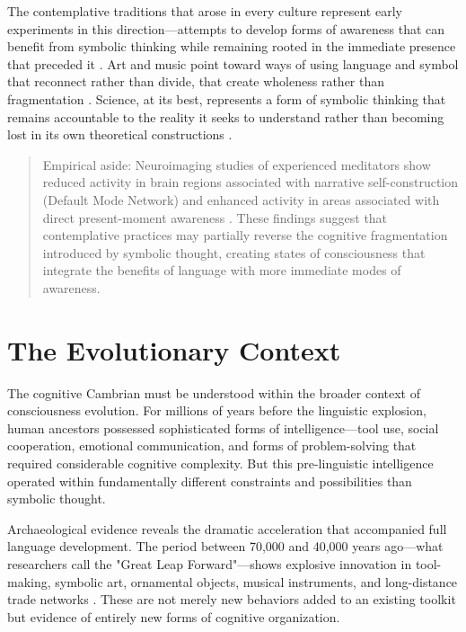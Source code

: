The contemplative traditions that arose in every culture represent early experiments in this direction—attempts to develop forms of awareness that can benefit from symbolic thinking while remaining rooted in the immediate presence that preceded it \parencite{tang2015brain}. Art and music point toward ways of using language and symbol that reconnect rather than divide, that create wholeness rather than fragmentation \parencite{dissanayake2015art}. Science, at its best, represents a form of symbolic thinking that remains accountable to the reality it seeks to understand rather than becoming lost in its own theoretical constructions \parencite{polanyi1958personal}.

\begin{quote}\small
Empirical aside: Neuroimaging studies of experienced meditators show reduced activity in brain regions associated with narrative self-construction (Default Mode Network) and enhanced activity in areas associated with direct present-moment awareness \parencite{brewer2011meditation}. These findings suggest that contemplative practices may partially reverse the cognitive fragmentation introduced by symbolic thought, creating states of consciousness that integrate the benefits of language with more immediate modes of awareness.
\end{quote}

\section{The Evolutionary Context}

The cognitive Cambrian must be understood within the broader context of consciousness evolution. For millions of years before the linguistic explosion, human ancestors possessed sophisticated forms of intelligence—tool use, social cooperation, emotional communication, and forms of problem-solving that required considerable cognitive complexity. But this pre-linguistic intelligence operated within fundamentally different constraints and possibilities than symbolic thought.

Archaeological evidence reveals the dramatic acceleration that accompanied full language development. The period between 70,000 and 40,000 years ago—what researchers call the "Great Leap Forward"—shows explosive innovation in tool-making, symbolic art, ornamental objects, musical instruments, and long-distance trade networks \parencite{mellars2007neanderthal,klein2009birth}. These are not merely new behaviors added to an existing toolkit but evidence of entirely new forms of cognitive organization.

